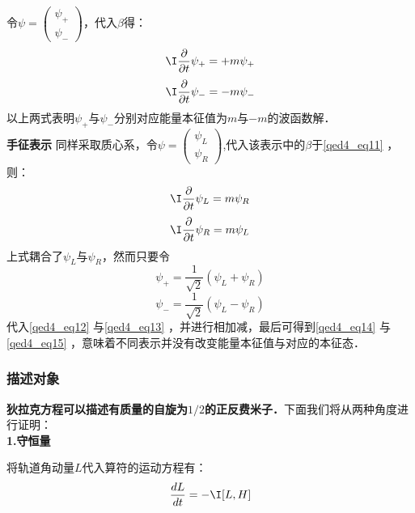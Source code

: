 令$\psi=\left(\begin{array}{l}\psi_{+} \\ \psi_{-}\end{array}\right)$，代入$\beta$得：
\begin{equation}\label{qed4_eq14}
 \I \frac{\partial}{\partial t} \psi_{+}=+m \psi_{+}
\end{equation}
\begin{equation}\label{qed4_eq15}
 \I \frac{\partial}{\partial t} \psi_{-}=-m \psi_{-}
\end{equation}
以上两式表明$\psi_{+}$与$\psi_{-}$分别对应能量本征值为$m$与$-m$的波函数解．\\\textbf{手征表示} 同样采取质心系，令$\psi=\left(\begin{array}{l}\psi_{L} \\ \psi_{R}\end{array}\right)$,代入该表示中的$\beta$于\autoref{qed4_eq11} ，则：
\begin{equation}\label{qed4_eq12}
 \I\frac{\partial}{\partial t} \psi_{L}=m \psi_{R}
\end{equation}
\begin{equation}\label{qed4_eq13}
 \I\frac{\partial}{\partial t} \psi_{R}=m \psi_{L}
\end{equation}
上式耦合了$\psi_{L}$与$\psi_{R}$，然而只要令
\begin{equation}
\psi_{+}=\frac{1}{\sqrt{2}}\left(\psi_{L}+\psi_{R}\right)
\end{equation}
\begin{equation}
\psi_{-}=\frac{1}{\sqrt{2}}\left(\psi_{L}-\psi_{R}\right)
\end{equation}
代入\autoref{qed4_eq12} 与\autoref{qed4_eq13} ，并进行相加减，最后可得到\autoref{qed4_eq14} 与\autoref{qed4_eq15} ，意味着不同表示并没有改变能量本征值与对应的本征态．
\subsubsection{描述对象}
\textbf{狄拉克方程可以描述有质量的自旋为$1/2$的正反费米子．}下面我们将从两种角度进行证明：\\
\textbf{1.守恒量}

将轨道角动量$L$代入算符的运动方程有：
\begin{equation}\label{qed4_eq16}
\frac{d {L}}{d t}=- \I[L,H]
\end{equation}

